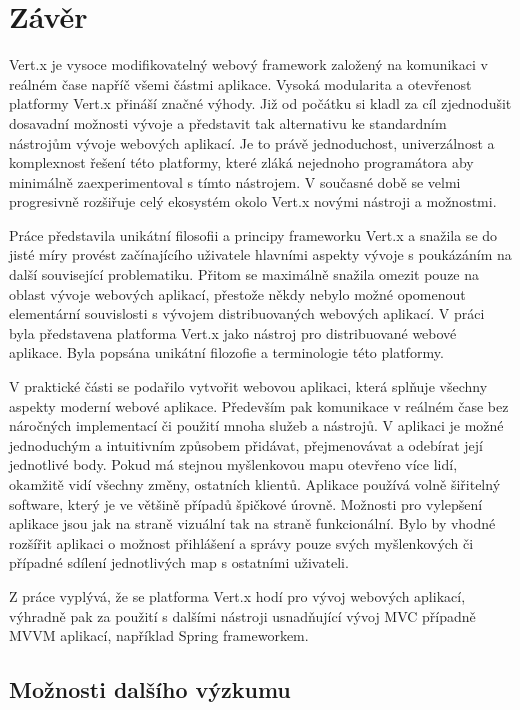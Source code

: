 
\chapter[Závěr]{Závěr}

Vert.x je vysoce modifikovatelný webový framework založený na komunikaci v reálném čase napříč všemi částmi aplikace. Vysoká modularita a otevřenost platformy Vert.x přináší značné výhody. Již od počátku si kladl za cíl zjednodušit dosavadní možnosti vývoje a představit tak alternativu ke standardním nástrojům vývoje webových aplikací. Je to právě jednoduchost, univerzálnost a komplexnost řešení této platformy, které zláká nejednoho programátora aby minimálně zaexperimentoval s tímto nástrojem. V současné době se velmi progresivně rozšiřuje celý ekosystém okolo Vert.x novými nástroji a možnostmi. 

Práce představila unikátní filosofii a principy frameworku Vert.x a snažila se do jisté 
míry provést začínajícího uživatele hlavními aspekty vývoje s poukázáním na další související 
problematiku. Přitom se maximálně snažila omezit pouze na oblast vývoje webových aplikací, 
přestože někdy nebylo možné opomenout elementární souvislosti s vývojem distribuovaných webových aplikací. V práci byla představena platforma Vert.x jako nástroj pro distribuované webové aplikace. Byla popsána unikátní filozofie a terminologie této platformy.

V praktické části se podařilo vytvořit webovou aplikaci, která splňuje všechny aspekty moderní webové aplikace. Především pak komunikace v reálném čase bez náročných implementací či použití mnoha služeb a nástrojů. V aplikaci je možné jednoduchým a intuitivním způsobem přidávat, přejmenovávat a odebírat její jednotlivé body. Pokud má stejnou myšlenkovou mapu otevřeno více lidí, okamžitě vidí všechny změny, ostatních klientů. Aplikace používá volně šiřitelný software, který je ve většině případů špičkové úrovně. %
Možnosti pro vylepšení aplikace jsou jak na straně vizuální tak na straně funkcionální. Bylo by vhodné rozšířit aplikaci o možnost přihlášení a správy pouze svých myšlenkových či případné sdílení jednotlivých map s ostatními uživateli.

 
Z práce vyplývá, že se platforma Vert.x hodí pro vývoj webových aplikací, výhradně pak za použití s dalšími nástroji usnadňující vývoj MVC případně MVVM aplikací, například Spring frameworkem.

\section{Možnosti dalšího výzkumu}


